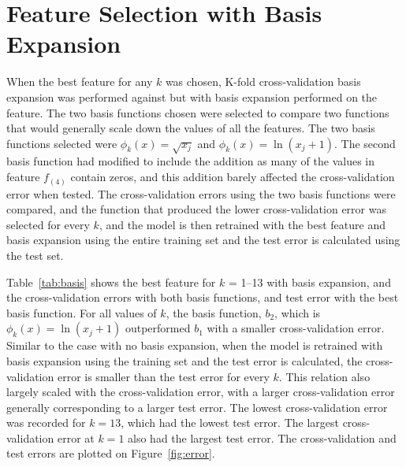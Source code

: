 \documentclass[12pt]{article}
\begin{document}
\section*{Feature Selection with Basis Expansion}
When the best feature for any $k$ was chosen, K-fold cross-validation basis expansion was performed against but with basis expansion performed on the feature. The two basis functions chosen were selected to compare two functions that would generally scale down the values of all the features. The two basis functions selected were $\phi_k(x) = \sqrt{x_j}$ and $\phi_k(x) = \ln(x_j + 1)$. The second basis function had modified to include the addition as many of the values in feature $f_{(4)}$ contain zeros, and this addition barely affected the cross-validation error when tested. The cross-validation errors using the two basis functions were compared, and the function that produced the lower cross-validation error was selected for every $k$, and the model is then retrained with the best feature and basis expansion using the entire training set and the test error is calculated using the test set.

Table~\ref{tab:basis} shows the best feature for $k$ = 1--13 with basis expansion, and the cross-validation errors with both basis functions, and test error with the best basis function. For all values of $k$, the basis function, $b_2$, which is $\phi_k(x) = \ln(x_j + 1)$ outperformed $b_1$ with a smaller cross-validation error. Similar to the case with no basis expansion, when the model is retrained with basis expansion using the training set and the test error is calculated, the cross-validation error is smaller than the test error for every $k$. This relation also largely scaled with the cross-validation error, with a larger cross-validation error generally corresponding to a larger test error. The lowest cross-validation error was recorded for $k = 13$, which had the lowest test error. The largest cross-validation error at $k = 1$ also had the largest test error. The cross-validation and test errors are plotted on Figure~\ref{fig:error}.
\end{document}
